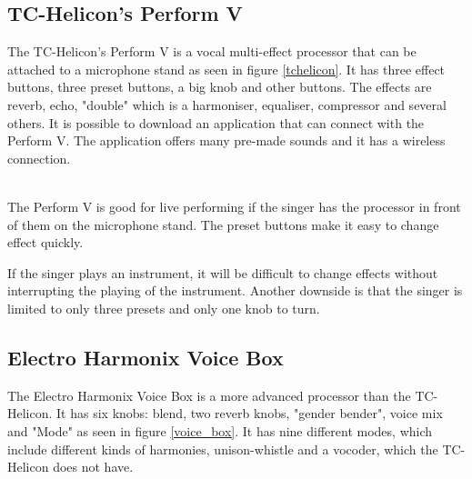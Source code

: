 \subsection{TC-Helicon's Perform V}

The TC-Helicon's Perform V is a vocal multi-effect processor that can be attached to a microphone stand as seen in figure \ref{tchelicon}\citep{TC}. It has three effect buttons, three preset buttons, a big knob and other buttons. The effects are reverb, echo, "double" which is a harmoniser, equaliser, compressor and several others. It is possible to download an application that can connect with the Perform V. The application offers many pre-made sounds and it has a wireless connection. \\

\begin{minipage}{\linewidth}%
\label{tchelicon}
\end{minipage}\\

The Perform V is good for live performing if the singer has the processor in front of them on the microphone stand. The preset buttons make it easy to change effect quickly. 

If the singer plays an instrument, it will be difficult to change effects without interrupting the playing of the instrument. Another downside is that the singer is limited to only three presets and only one knob to turn.

\subsection{Electro Harmonix Voice Box}

The Electro Harmonix Voice Box is a more advanced processor than the TC-Helicon\citep{VoiceBox}. It has six knobs: blend, two reverb knobs, "gender bender", voice mix and "Mode" as seen in figure \ref{voice_box}. It has nine different modes, which include different kinds of harmonies, unison-whistle and a vocoder, which the TC-Helicon does not have.\\

\begin{minipage}{\linewidth}%
\label{voice_box}
\end{minipage}\\

